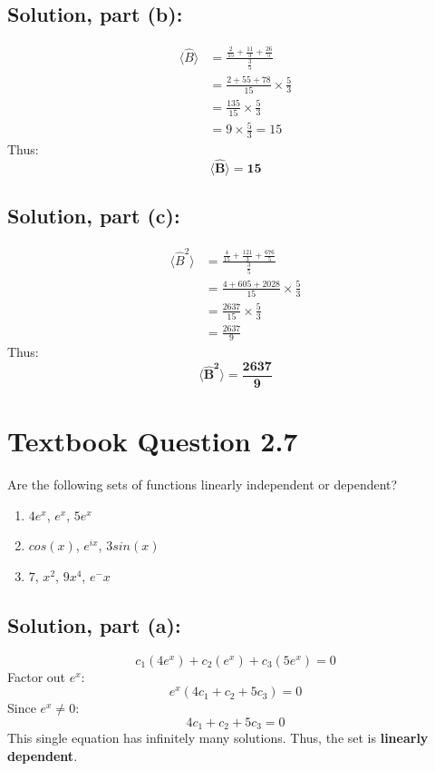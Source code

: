 \documentclass[12pt]{article}
\begin{document}
    \subsection{Solution, part (b):}
        \begin{align*}
        \langle\hat{B}\rangle &= \frac{\frac{2}{15} + \frac{11}{3} + \frac{26}{5}}{\frac{3}{5}}\\[6pt]
        &= \frac{2 + 55 + 78}{15} \times \frac{5}{3} \\
        &= \frac{135}{15}\times\frac{5}{3}\\[6pt]
        &= 9\times\frac{5}{3} = 15
        \end{align*}
        Thus:
        \[
        \boldsymbol{\langle\hat{B}\rangle = 15}
        \]

    \subsection{Solution, part (c):}
        \begin{align*}
        \langle\hat{B}^2\rangle &= \frac{\frac{4}{15} + \frac{121}{3} + \frac{676}{5}}{\frac{3}{5}}\\[6pt]
        &= \frac{4 + 605 + 2028}{15}\times\frac{5}{3} \\
        &= \frac{2637}{15}\times\frac{5}{3} \\
        &= \frac{2637}{9}
        \end{align*}
        Thus:
        \[
        \boldsymbol{\langle\hat{B}^2\rangle = \frac{2637}{9}}
        \]


      
\section{Textbook Question 2.7}
   Are the following sets of functions linearly independent or dependent?
   \begin{enumerate}
       \item [(a)] $4e^x$, $e^x$, $5e^x$
       \item [(b)] $cos(x)$, $e^{ix}$, $3 sin(x)$
       \item [(c)] $7$, $x^2$, $9x^4$, $e^-x$
   \end{enumerate}
    
    
     
    



    \subsection{Solution, part (a):} 
        \[
        c_1(4e^x) + c_2(e^x) + c_3(5e^x) = 0
        \]
        Factor out $e^x$:
        \[
        e^x(4c_1 + c_2 + 5c_3) = 0
        \]
        Since $e^x \neq 0$:
        \[
        4c_1 + c_2 + 5c_3 = 0
        \]
        This single equation has infinitely many solutions. Thus, the set is \textbf{linearly dependent}.
\end{document}
